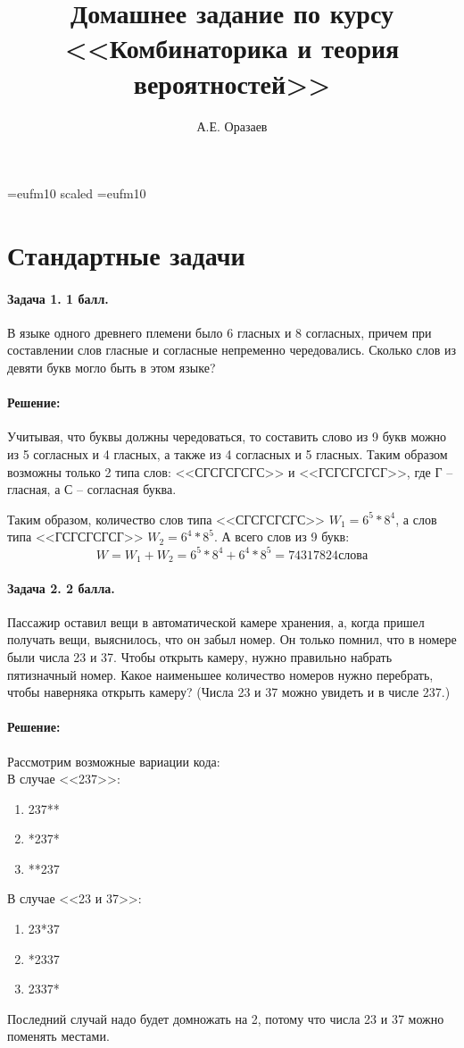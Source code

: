 \documentclass[12pt]{article}
\title{\bf Домашнее задание по курсу \\ <<Комбинаторика 
и теория вероятностей>>}
\author{А.Е. Оразаев}
\date{}
\begin{document}
\voffset=-20mm 
\hoffset=-12mm
\font\Got=eufm10 scaled \font\Got=eufm10

\maketitle

\section{Стандартные задачи}



\paragraph{Задача 1. 1 балл.} В языке одного древнего племени было 
6 гласных и 8 согласных, причем при составлении слов гласные и 
согласные непременно чередовались. Сколько слов из девяти букв 
могло быть в этом языке? 

\paragraph{\bf Решение:}
Учитывая, что буквы должны чередоваться, то составить слово из 9 букв
можно из 5 согласных и 4 гласных, а также из 4 согласных и 5 гласных.
Таким образом возможны только 2 типа слов: <<СГСГСГСГС>> и <<ГСГСГСГСГ>>, где
Г -- гласная, а С -- согласная буква.

Таким образом, количество слов типа <<СГСГСГСГС>> $ W_1 = 6^5 * 8^4 $,
а слов типа <<ГСГСГСГСГ>> $ W_2 = 6^4 * 8^5 $. А всего слов из 9 букв:
$$ W = W_1 + W_2 = 6^5 * 8^4 + 6^4 * 8^5 = 74317824 слова$$



\paragraph{Задача 2. 2 балла.} Пассажир оставил вещи в 
автоматической камере хранения, а, когда пришел получать вещи, 
выяснилось, что он забыл номер. Он только помнил, что в номере 
были числа 23 и 37. Чтобы открыть камеру, нужно правильно 
набрать пятизначный номер. Какое наименьшее количество номеров 
нужно перебрать, чтобы наверняка открыть камеру? (Числа 23 и 37 
можно увидеть и в числе 237.)

\paragraph{\bf Решение:}
Рассмотрим возможные вариации кода: \\
В случае <<237>>:
\begin{enumerate}
\item 237**
\item *237*
\item **237
\end{enumerate}
В случае <<23 и 37>>:
\begin{enumerate}
\item 23*37
\item *2337
\item 2337*
\end{enumerate}
Последний случай надо будет домножать на 2, потому что числа 23 и 37
можно поменять местами.
\end{document}
